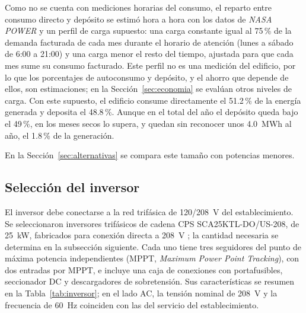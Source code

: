 Como no se cuenta con mediciones horarias del consumo, el reparto entre consumo directo y depósito se estimó hora a hora con los datos de \textit{NASA POWER} y un perfil de carga supuesto: una carga constante igual al 75\,\% de la demanda facturada de cada mes durante el horario de atención (lunes a sábado de 6:00 a 21:00) y una carga menor el resto del tiempo, ajustada para que cada mes sume su consumo facturado. Este perfil no es una medición del edificio, por lo que los porcentajes de autoconsumo y depósito, y el ahorro que depende de ellos, son estimaciones; en la Sección~\ref{sec:economia} se evalúan otros niveles de carga. Con este supuesto, el edificio consume directamente el 51.2\,\% de la energía generada y deposita el 48.8\,\%. Aunque en el total del año el depósito queda bajo el 49\,\%, en los meses secos lo supera, y quedan sin reconocer unos \SI{4.0}{MWh} al año, el 1.8\,\% de la generación.

En la Sección~\ref{sec:alternativas} se compara este tamaño con potencias menores.

\subsection{Selección del inversor}

El inversor debe conectarse a la red trifásica de 120/\SI{208}{V} del establecimiento. Se seleccionaron inversores trifásicos de cadena CPS SCA25KTL-DO/US-208, de \SI{25}{kW}, fabricados para conexión directa a \SI{208}{V} \cite{cps_ds}; la cantidad necesaria se determina en la subsección siguiente. Cada uno tiene tres seguidores del punto de máxima potencia independientes (MPPT, \textit{Maximum Power Point Tracking}), con dos entradas por MPPT, e incluye una caja de conexiones con portafusibles, seccionador DC y descargadores de sobretensión. Sus características se resumen en la Tabla~\ref{tab:inversor}; en el lado AC, la tensión nominal de \SI{208}{V} y la frecuencia de \SI{60}{Hz} coinciden con las del servicio del establecimiento.

